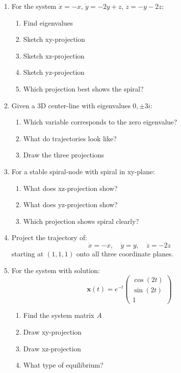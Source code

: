 \documentclass[12pt]{article}
\begin{document}
\begin{enumerate}[resume]
\item For the system $\dot{x} = -x$, $\dot{y} = -2y + z$, $\dot{z} = -y - 2z$:
\begin{enumerate}[label=(\alph*)]
    \item Find eigenvalues
    \item Sketch xy-projection
    \item Sketch xz-projection
    \item Sketch yz-projection
    \item Which projection best shows the spiral?
\end{enumerate}

\item Given a 3D center-line with eigenvalues $0, \pm 3i$:
\begin{enumerate}[label=(\alph*)]
    \item Which variable corresponds to the zero eigenvalue?
    \item What do trajectories look like?
    \item Draw the three projections
\end{enumerate}

\item For a stable spiral-node with spiral in xy-plane:
\begin{enumerate}[label=(\alph*)]
    \item What does xz-projection show?
    \item What does yz-projection show?
    \item Which projection shows spiral clearly?
\end{enumerate}

\item Project the trajectory of:
$$\dot{x} = -x, \quad \dot{y} = y, \quad \dot{z} = -2z$$
starting at $(1,1,1)$ onto all three coordinate planes.

\item For the system with solution:
$$\mathbf{x}(t) = e^{-t}\begin{pmatrix} \cos(2t) \\ \sin(2t) \\ 1 \end{pmatrix}$$
\begin{enumerate}[label=(\alph*)]
    \item Find the system matrix $A$
    \item Draw xy-projection
    \item Draw xz-projection
    \item What type of equilibrium?
\end{enumerate}
\end{enumerate}
\end{document}
